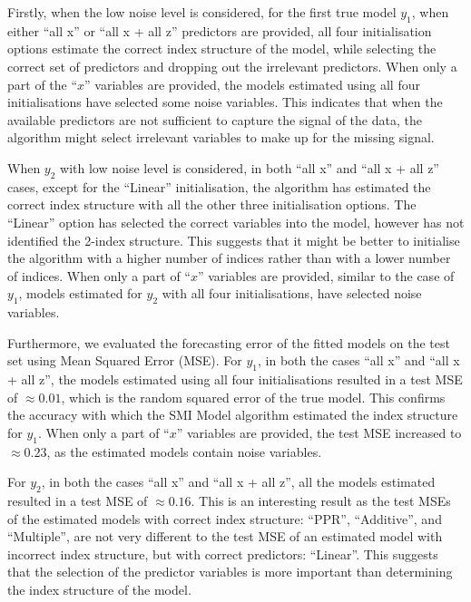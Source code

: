 \documentclass[11pt,a4paper,]{article}
\begin{document}
Firstly, when the low noise level is considered, for the first true
model \(y_{1}\), when either ``all x'' or ``all x + all z'' predictors
are provided, all four initialisation options estimate the correct index
structure of the model, while selecting the correct set of predictors
and dropping out the irrelevant predictors. When only a part of the
``\(x\)'' variables are provided, the models estimated using all four
initialisations have selected some noise variables. This indicates that
when the available predictors are not sufficient to capture the signal
of the data, the algorithm might select irrelevant variables to make up
for the missing signal.

When \(y_{2}\) with low noise level is considered, in both ``all x'' and
``all x + all z'' cases, except for the ``Linear'' initialisation, the
algorithm has estimated the correct index structure with all the other
three initialisation options. The ``Linear'' option has selected the
correct variables into the model, however has not identified the 2-index
structure. This suggests that it might be better to initialise the
algorithm with a higher number of indices rather than with a lower
number of indices. When only a part of ``\(x\)'' variables are provided,
similar to the case of \(y_{1}\), models estimated for \(y_{2}\) with
all four initialisations, have selected noise variables.

Furthermore, we evaluated the forecasting error of the fitted models on
the test set using Mean Squared Error (MSE). For \(y_{1}\), in both the
cases ``all x'' and ``all x + all z'', the models estimated using all
four initialisations resulted in a test MSE of \(\approx 0.01\), which
is the random squared error of the true model. This confirms the
accuracy with which the SMI Model algorithm estimated the index
structure for \(y_{1}\). When only a part of ``\(x\)'' variables are
provided, the test MSE increased to \(\approx 0.23\), as the estimated
models contain noise variables.

For \(y_{2}\), in both the cases ``all x'' and ``all x + all z'', all
the models estimated resulted in a test MSE of \(\approx 0.16\). This is
an interesting result as the test MSEs of the estimated models with
correct index structure: ``PPR'', ``Additive'', and ``Multiple'', are
not very different to the test MSE of an estimated model with incorrect
index structure, but with correct predictors: ``Linear''. This suggests
that the selection of the predictor variables is more important than
determining the index structure of the model.
\end{document}
